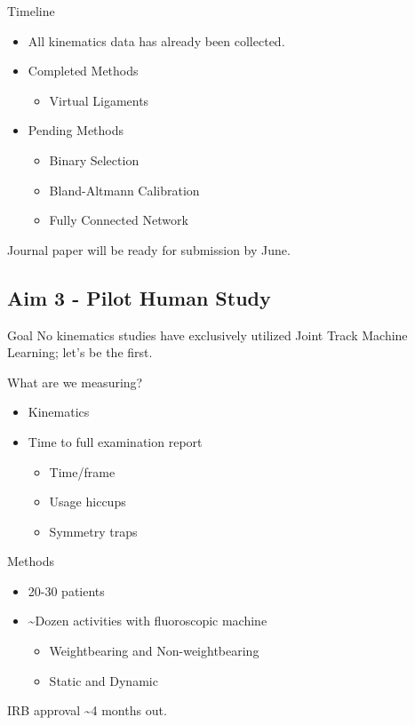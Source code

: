 \documentclass[presentation, aspectratio=1610]{beamer}
\begin{document}
\begin{frame}[label={sec:org8d57691}]{Timeline}
\begin{itemize}
\item All kinematics data has already been collected.
\item Completed Methods
\begin{itemize}
\item Virtual Ligaments
\end{itemize}
\item Pending Methods
\begin{itemize}
\item Binary Selection
\item Bland-Altmann Calibration
\item Fully Connected Network
\end{itemize}
\end{itemize}

Journal paper will be ready for submission by June.
\end{frame}

\subsection{Aim 3 - Pilot Human Study}
\label{sec:org13353bf}
\begin{frame}[label={sec:orgb6552c1}]{Goal}
No kinematics studies have exclusively utilized Joint Track Machine Learning; let's be the first.

What are we measuring?
\begin{itemize}
\item Kinematics
\item Time to full examination report
\begin{itemize}
\item Time/frame
\item Usage hiccups
\item Symmetry traps
\end{itemize}
\end{itemize}
\end{frame}

\begin{frame}[label={sec:org79c2ce4}]{Methods}
\begin{itemize}
\item 20-30 patients
\item \textasciitilde{}Dozen activities with fluoroscopic machine
\begin{itemize}
\item Weightbearing and Non-weightbearing
\item Static and Dynamic
\end{itemize}
\end{itemize}

IRB approval \textasciitilde{}4 months out.
\end{frame}
\end{document}
